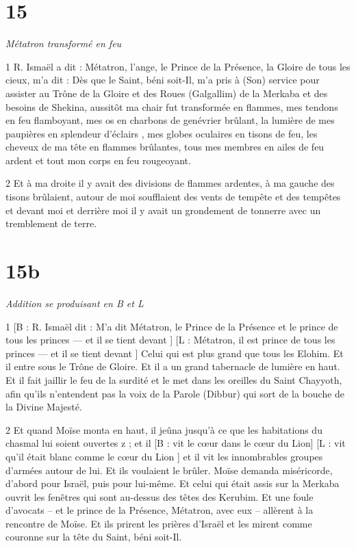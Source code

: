 \chapter{15}

\par \textit{Métatron transformé en feu}

\par 1 R. Ismaël a dit : Métatron, l'ange, le Prince de la Présence, la Gloire de tous les cieux, m'a dit : Dès que le Saint, béni soit-Il, m'a pris à (Son) service pour assister au Trône de la Gloire et des Roues (Galgallim) de la Merkaba et des besoins de Shekina, aussitôt ma chair fut transformée en flammes, mes tendons en feu flamboyant, mes os en charbons de genévrier brûlant, la lumière de mes paupières en splendeur d'éclairs , mes globes oculaires en tisons de feu, les cheveux de ma tête en flammes brûlantes, tous mes membres en ailes de feu ardent et tout mon corps en feu rougeoyant.

\par 2 Et à ma droite il y avait des divisions de flammes ardentes, à ma gauche des tisons brûlaient, autour de moi soufflaient des vents de tempête et des tempêtes et devant moi et derrière moi il y avait un grondement de tonnerre avec un tremblement de terre.

\chapter{15b}

\par \textit{Addition se produisant en B et L}

\par 1 [B : R. Ismaël dit : M'a dit Métatron, le Prince de la Présence et le prince de tous les princes — et il se tient devant ] [L : Métatron, il est prince de tous les princes — et il se tient devant ] Celui qui est plus grand que tous les Elohim. Et il entre sous le Trône de Gloire. Et il a un grand tabernacle de lumière en haut. Et il fait jaillir le feu de la surdité et le met dans les oreilles du Saint Chayyoth, afin qu'ils n'entendent pas la voix de la Parole (Dibbur) qui sort de la bouche de la Divine Majesté.

\par 2 Et quand Moïse monta en haut, il jeûna jusqu'à ce que les habitations du chasmal lui soient ouvertes z ; et il [B : vit le cœur dans le cœur du Lion] [L : vit qu'il était blanc comme le cœur du Lion ] et il vit les innombrables groupes d'armées autour de lui. Et ils voulaient le brûler. Moïse demanda miséricorde, d'abord pour Israël, puis pour lui-même. Et celui qui était assis sur la Merkaba ouvrit les fenêtres qui sont au-dessus des têtes des Kerubim. Et une foule d’avocats – et le prince de la Présence, Métatron, avec eux – allèrent à la rencontre de Moïse. Et ils prirent les prières d'Israël et les mirent comme couronne sur la tête du Saint, béni soit-Il.

